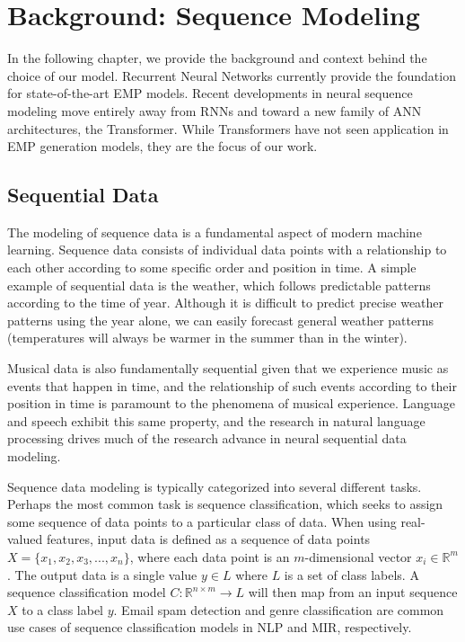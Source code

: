 \chapter{Background: Sequence Modeling}\label{ch:ch3}
In the following chapter, we provide the background and context behind the choice of our model. Recurrent Neural Networks currently provide the foundation for state-of-the-art EMP models. Recent developments in neural sequence modeling move entirely away from RNNs and toward a new family of ANN architectures, the Transformer. While Transformers have not seen application in EMP generation models, they are the focus of our work. 

\section{Sequential Data}\label{sec:sequential-data}
The modeling of sequence data is a fundamental aspect of modern machine learning. Sequence data consists of individual data points with a relationship to each other according to some specific order and position in time. A simple example of sequential data is the weather, which follows predictable patterns according to the time of year. Although it is difficult to predict precise weather patterns using the year alone, we can easily forecast general weather patterns (temperatures will always be warmer in the summer than in the winter). 

Musical data is also fundamentally sequential\cite{widmer2016getting} given that we experience music as events that happen in time, and the relationship of such events according to their position in time is paramount to the phenomena of musical experience. Language and speech exhibit this same property, and the research in natural language processing drives much of the research advance in neural sequential data modeling. 

Sequence data modeling is typically categorized into several different tasks. Perhaps the most common task is sequence classification, which seeks to assign some sequence of data points to a particular class of data. When using real-valued features, input data is defined as a sequence of data points $X = \{x_1, x_2, x_3, ..., x_n\}$, where each data point is an $m$-dimensional vector $x_i \in \mathbb{R}^m$. The output data is a single value $y \in L$ where $L$ is a set of class labels. A sequence classification model $C: \mathbb{R}^{n \times m} \rightarrow L$ will then map from an input sequence $X$ to a class label $y$. Email spam detection and genre classification are common use cases of sequence classification models in NLP and MIR, respectively. 

